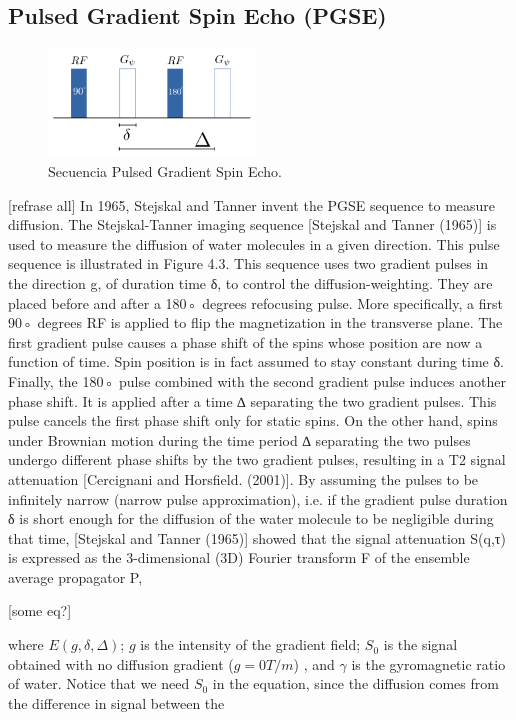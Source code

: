 \subsection{Pulsed Gradient Spin Echo (PGSE)}
\begin{figure}
    \includegraphics[width=0.49\textwidth]{2.background/mri/img/fgp.png}
    \caption{Secuencia Pulsed Gradient Spin Echo.}
    \label{fig:fgp}
\end{figure}  

[refrase all]
In 1965, Stejskal and Tanner invent the PGSE sequence to measure diffusion. 
The Stejskal-Tanner imaging sequence [Stejskal and Tanner (1965)] is used to
measure the diffusion of water molecules in a given direction. This pulse
sequence is illustrated in Figure 4.3. This sequence uses two gradient pulses
in the direction g, of duration time δ, to control the diffusion-weighting.
They are placed before and after a 180◦ degrees refocusing pulse.
More specifically, a first 90◦ degrees RF is applied to flip the magnetization
in the transverse plane. The first gradient pulse causes a phase shift of the
spins whose position are now a function of time. Spin position is in fact
assumed to stay constant during time δ. Finally, the 180◦ pulse combined with
the second gradient pulse induces another phase shift. It is applied after a time
∆ separating the two gradient pulses. This pulse cancels the first phase
shift only for static spins. On the other hand, spins under Brownian motion during
the time period ∆ separating the two pulses undergo different phase shifts by
the two gradient pulses, resulting in a T2 signal attenuation [Cercignani and Horsfield. (2001)].
By assuming the pulses to be infinitely narrow (narrow pulse approximation), i.e.
if the gradient pulse duration δ is short enough for the diffusion of the water molecule
to be negligible during that time, [Stejskal and Tanner (1965)] showed that the signal
attenuation S(q,τ) is expressed as the 3-dimensional (3D) Fourier transform
F of the ensemble average propagator P,

[some eq?]

where $E(g, \delta, \Delta)$;
$g$ is the intensity of the gradient field;
$S_0$ is the signal obtained with no diffusion gradient ($g=0 T/m$)
, and $\gamma$ is the gyromagnetic ratio of water.
Notice that we need $S_0$ in the equation, since the diffusion comes from the difference in signal between the 

